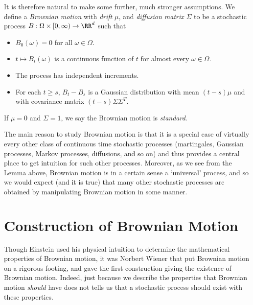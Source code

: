 It is therefore natural to make some further, much stronger assumptions. We define a \emph{Brownian motion} with \emph{drift} $\mu$, and \emph{diffusion matrix} $\Sigma$ to be a stochastic process $B: \Omega \times [0,\infty) \to \RR^d$ such that
%
\begin{itemize}
    \item $B_0(\omega) = 0$ for all $\omega \in \Omega$.
    \item $t \mapsto B_t(\omega)$ is a continuous function of $t$ for almost every $\omega \in \Omega$.
    \item The process has independent increments.
    \item For each $t \geq s$, $B_t - B_s$ is a Gaussian distribution with mean $(t - s) \mu$ and with covariance matrix $(t-s) \Sigma \Sigma^T$.
\end{itemize}
%
If $\mu = 0$ and $\Sigma = 1$, we say the Brownian motion is \emph{standard}.

The main reason to study Brownian motion is that it is a special case of virtually every other class of continuous time stochastic processes (martingales, Gaussian processes, Markov processes, diffusions, and so on) and thus provides a central place to get intuition for such other processes. Moreover, as we see from the Lemma above, Brownian motion is in a certain sense a `universal' process, and so we would expect (and it is true) that many other stochastic processes are obtained by manipulating Brownian motion in some manner.

\section{Construction of Brownian Motion}

Though Einstein used his physical intuition to determine the mathematical properties of Brownian motion, it was Norbert Wiener that put Brownian motion on a rigorous footing, and gave the first construction giving the existence of Brownian motion. Indeed, just because we describe the properties that Brownian motion {\it should} have does not tells us that a stochastic process should exist with these properties.

